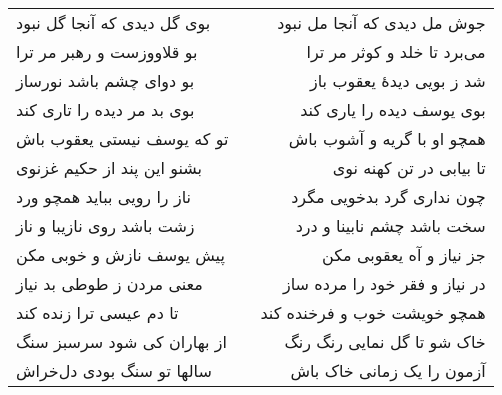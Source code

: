 \begin{center}
\begin{longtable}{l p{0.5cm} r}
بوی گل دیدی که آنجا گل نبود
&&
جوش مل دیدی که آنجا مل نبود
\\
بو قلاووزست و رهبر مر ترا
&&
می‌برد تا خلد و کوثر مر ترا
\\
بو دوای چشم باشد نورساز
&&
شد ز بویی دیدهٔ یعقوب باز
\\
بوی بد مر دیده را تاری کند
&&
بوی یوسف دیده را یاری کند
\\
تو که یوسف نیستی یعقوب باش
&&
همچو او با گریه و آشوب باش
\\
بشنو این پند از حکیم غزنوی
&&
تا بیابی در تن کهنه نوی
\\
ناز را رویی بباید همچو ورد
&&
چون نداری گرد بدخویی مگرد
\\
زشت باشد روی نازیبا و ناز
&&
سخت باشد چشم نابینا و درد
\\
پیش یوسف نازش و خوبی مکن
&&
جز نیاز و آه یعقوبی مکن
\\
معنی مردن ز طوطی بد نیاز
&&
در نیاز و فقر خود را مرده ساز
\\
تا دم عیسی ترا زنده کند
&&
همچو خویشت خوب و فرخنده کند
\\
از بهاران کی شود سرسبز سنگ
&&
خاک شو تا گل نمایی رنگ رنگ
\\
سالها تو سنگ بودی دل‌خراش
&&
آزمون را یک زمانی خاک باش
\\
\end{longtable}
\end{center}
